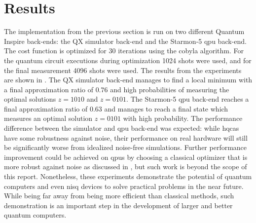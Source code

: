 \section{Results}
The implementation from the previous section is run on two different Quantum Inspire back-ends: the QX simulator back-end and the Starmon-5 \gls{qpu} back-end.
The cost function is optimized for 30 iterations using the \gls{cobyla} algorithm.
For the quantum circuit executions during optimization 1024 shots were used, and for the final measurement 4096 shots were used.
The results from the experiments are shown in .
The QX simulator back-end manages to find a local minimum with a final approximation ratio of $0.76$ and high probabilities of measuring the optimal solutions $z = 1010$ and $z = 0101$.
The Starmon-5 \gls{qpu} back-end reaches a final approximation ratio of $0.63$ and manages to reach a final state which measures an optimal solution $z = 0101$ with high probability.
The performance difference between the simulator and \gls{qpu} back-end was expected: while \glspl{hqca} have some robustness against noise, their performance on real hardware will still be significantly worse from idealized noise-free simulations.
Further performance improvement could be achieved on \glspl{qpu} by choosing a classical optimizer that is more robust against noise as discussed in \cite{lavrijsen2020classical, sung2020exploration}, but such work is beyond the scope of this report.
Nonetheless, these experiments demonstrate the potential of quantum computers and even \gls{nisq} devices to solve practical problems in the near future.
While being far away from being more efficient than classical methods, such demonstration is an important step in the development of larger and better quantum computers.


